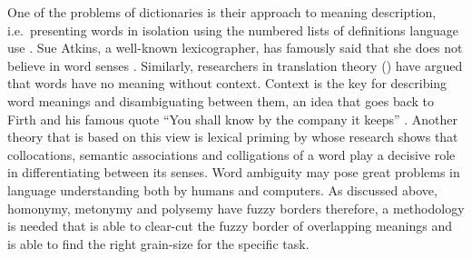 \documentclass[11pt]{article}
\begin{document}
One of the problems of dictionaries is their approach to meaning description,
i.e.~presenting words in isolation using the numbered lists of definitions
language use \citep{han:2000}. Sue Atkins, a well-known lexicographer, has
famously said that she does not believe in word senses \citep{kil:19997}.
Similarly, researchers in translation theory (\cite{nid:19997}) have argued that
words have no meaning without context. Context is the key for describing word
meanings and disambiguating between them, an idea that goes back to Firth and
his famous quote ``You shall know by the company it keeps'' \citep{Firth:1957}.
Another theory that is based on this view is lexical
priming by \citet{hoe:2005} whose research shows that collocations, semantic
associations and colligations of a word play a decisive role in differentiating
between its senses.
Word ambiguity may pose great problems in language understanding both by humans and computers.
As discussed above, homonymy, metonymy and polysemy have fuzzy borders 
therefore, a methodology is needed that is able to clear-cut the fuzzy border of overlapping meanings and is able to find the right grain-size for the specific task.
\end{document}
